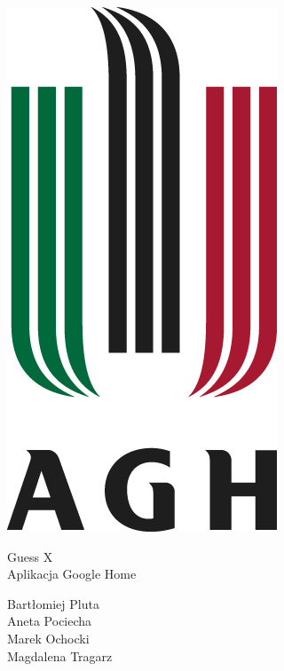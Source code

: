 \documentclass[a4paper,11pt]{article}
\begin{document}
	\begin{titlepage} 
		\begin{center}
			\includegraphics[scale=0.4]{agh.jpg}
		\end{center}

	
	\begin{center}
		\fontsize{32pt}{80pt}\selectfont
		\vspace{0.7cm}
		Guess X \\ 
		\fontsize{18pt}{30pt}\selectfont
		 Aplikacja Google Home
		\vspace{0.7cm}
	\end{center}

	
		\vfill
		\parbox[t]{0.93\textwidth}{
			\raggedleft
			\large
			{\Large Bartłomiej Pluta}\\[4pt]
			{\Large Aneta Pociecha}\\[4pt]
			{\Large Marek Ochocki}\\[4pt]
			{\Large Magdalena Tragarz}\\[4pt]
		}	
	\end{titlepage}
	
	
\end{document}
